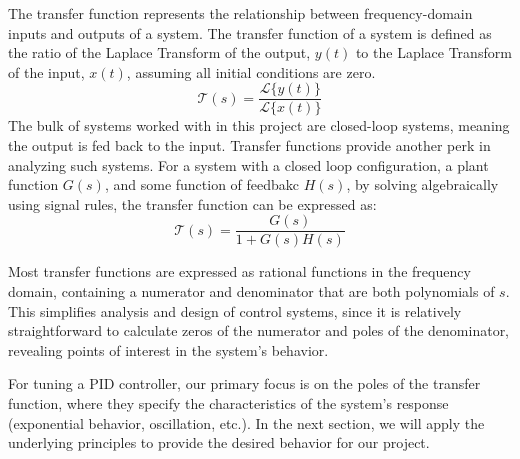 \documentclass[journal]{IEEEtran}
\begin{document}
The transfer function represents the relationship between frequency-domain inputs and 
outputs of a system. The transfer function of a system is defined as the ratio of the 
Laplace Transform of the output, $y(t)$ to the Laplace Transform of the input, $x(t)$, 
assuming all initial conditions are zero.
\begin{equation}
\mathcal{T}(s) = \frac{\mathcal{L}\{y(t)\}}{\mathcal{L}\{x(t)\}}
\end{equation}
The bulk of systems worked with in this project are closed-loop systems, meaning the output is 
fed back to the input. Transfer functions provide another perk in analyzing such systems. 
For a system with a closed loop configuration, a plant function $G(s)$, 
and some function of feedbakc $H(s)$, by solving algebraically using signal rules, 
the transfer function can be expressed as:
\begin{equation}
\mathcal{T}(s) = \frac{G(s)}{1 + G(s)H(s)}
\end{equation}

Most transfer functions are expressed as rational functions in the frequency domain, 
containing a numerator and denominator that are both polynomials of $s$. 
This simplifies analysis and design of control systems, since it is relatively straightforward 
to calculate zeros of the numerator and poles of the denominator, revealing points of interest 
in the system's behavior. 

For tuning a PID controller, our primary focus is on the poles of the transfer function, 
where they specify the characteristics of the system's response
(exponential behavior, oscillation, etc.). In the next section, we will apply 
the underlying principles to provide the desired behavior for our project.
\end{document}
